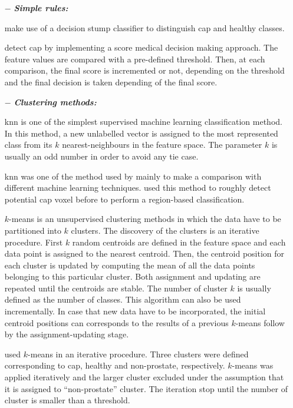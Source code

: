 \begin{enumerate}[leftmargin=*]

\item[$-$] \textbf{\textit{Simple rules:}}

\cite{Lv2009} make use of a decision stump classifier to distinguish \ac{cap} and healthy classes. 

\cite{Puech2009} detect \ac{cap} by implementing a score medical decision making approach. The feature values are compared with a pre-defined threshold. Then, at each comparison, the final score is incremented or not, depending on the threshold and the final decision is taken depending of the final score.

\item[$-$] \textbf{\textit{Clustering methods:}} 

\acf{knn} is one of the simplest supervised machine learning classification method. In this method, a new unlabelled vector is assigned to the most represented class from its $k$ nearest-neighbours in the feature space. The parameter $k$ is usually an odd number in order to avoid any tie case. 

\ac{knn} was one of the method used by \cite{Niaf2011,Niaf2012} mainly to make a comparison with different machine learning techniques. \cite{Litjens2012} used this method to roughly detect potential \ac{cap} voxel before to perform a region-based classification.

$k$-means is an unsupervised clustering methods in which the data have to be partitioned into $k$ clusters. The discovery of the clusters is an iterative procedure. First $k$ random centroids are defined in the feature space and each data point is assigned to the nearest centroid. Then, the centroid position for each cluster is updated by computing the mean of all the data points belonging to this particular cluster. Both assignment and updating are repeated until the centroids are stable. The number of cluster $k$ is usually defined as the number of classes. This algorithm can also be used incrementally. In case that new data have to be incorporated, the initial centroid positions can corresponds to the results of a previous $k$-means follow by the assignment-updating stage.

\cite{Tiwari2007,Tiwari2009} used $k$-means in an iterative procedure. Three clusters were defined corresponding to \ac{cap}, healthy and non-prostate, respectively. $k$-means was applied iteratively and the larger cluster excluded under the assumption that it is assigned to ``non-prostate'' cluster. The iteration stop until the number of cluster is smaller than a threshold.


\end{enumerate}
